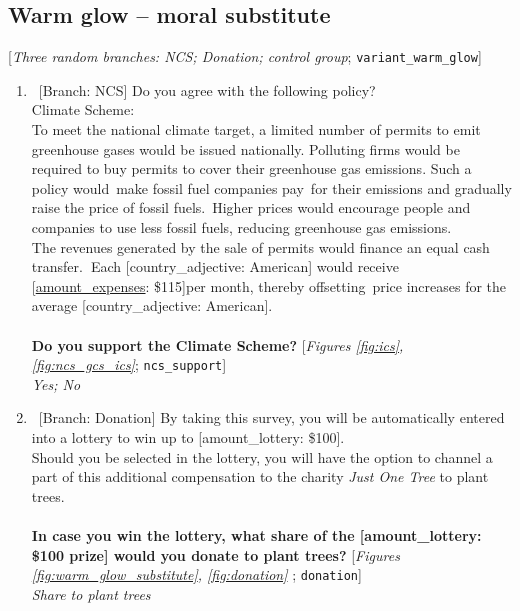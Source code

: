 \subsection*{Warm glow -- moral substitute} 
 [\textit{Three random branches: NCS; Donation; control group};  \verb|variant_warm_glow|] 
 \begin{enumerate}[resume] 
\item ~[Branch: NCS] \label{q:ncs_support} Do you agree with the following policy?
~\\
Climate Scheme:~\\
To meet the national climate target, a limited number of permits to emit greenhouse gases would be issued nationally. Polluting firms would be required to buy permits to cover their greenhouse gas emissions. Such a policy would~make fossil fuel companies pay~for their emissions and gradually raise the price of fossil fuels.~Higher prices would encourage people and companies to use less fossil fuels, reducing greenhouse gas emissions.\\
The revenues generated by the sale of permits would finance an equal cash transfer.\textbf{~}Each [country\_adjective: American] would receive [\hyperlink{tab_features}{amount\_expenses}: \$115]per month, thereby offsetting~price increases for the average [country\_adjective: American].\\ 
~\\
\textbf{Do you support the Climate Scheme?} [\textit{Figures \ref{fig:ics}, \ref{fig:ncs_gcs_ics}}; 
\verb|ncs_support|]
  \\ \textit{Yes; No}

\item ~[Branch: Donation] \label{q:donation} By taking this survey, you will be automatically entered into a lottery to win up to [amount\_lottery: \$100]. \\Should you be selected in the lottery, you will have the option to channel a part of this additional compensation to the charity \textit{Just One Tree} to plant trees.\\\\\textbf{In case you win the lottery, what share of the [amount\_lottery: \$100 prize] would you donate to plant trees?} [\textit{Figures \ref{fig:warm_glow_substitute}, \ref{fig:donation}
}; 
\verb|donation|]
  \\ \textit{Share to plant trees}

\end{enumerate} 

